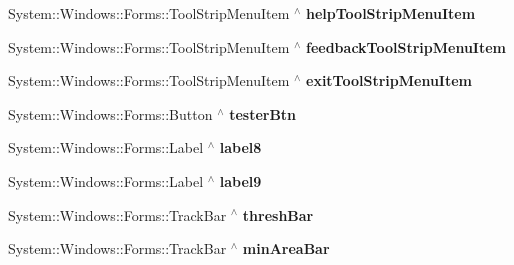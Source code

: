 \begin{DoxyCompactItemize}
\item 
\mbox{\label{class_gaze_track_g_u_i_1_1_g_u_i_ada9969399d8168dfd015a1aaa49f4c5c}} 
System\+::\+Windows\+::\+Forms\+::\+Tool\+Strip\+Menu\+Item $^\wedge$ {\bfseries help\+Tool\+Strip\+Menu\+Item}
\item 
\mbox{\label{class_gaze_track_g_u_i_1_1_g_u_i_a5c3dd5efc42814cdbb9c62536df21c50}} 
System\+::\+Windows\+::\+Forms\+::\+Tool\+Strip\+Menu\+Item $^\wedge$ {\bfseries feedback\+Tool\+Strip\+Menu\+Item}
\item 
\mbox{\label{class_gaze_track_g_u_i_1_1_g_u_i_a068e9aa97af71ba1d8130ebb7d393972}} 
System\+::\+Windows\+::\+Forms\+::\+Tool\+Strip\+Menu\+Item $^\wedge$ {\bfseries exit\+Tool\+Strip\+Menu\+Item}
\item 
\mbox{\label{class_gaze_track_g_u_i_1_1_g_u_i_aedc1a63f28084b1c0c583e72fd97e71a}} 
System\+::\+Windows\+::\+Forms\+::\+Button $^\wedge$ {\bfseries tester\+Btn}
\item 
\mbox{\label{class_gaze_track_g_u_i_1_1_g_u_i_ae04a6c2335c5d66920dcf5fe66505096}} 
System\+::\+Windows\+::\+Forms\+::\+Label $^\wedge$ {\bfseries label8}
\item 
\mbox{\label{class_gaze_track_g_u_i_1_1_g_u_i_aa5cb9097905298bf7eee197d242e9f61}} 
System\+::\+Windows\+::\+Forms\+::\+Label $^\wedge$ {\bfseries label9}
\item 
\mbox{\label{class_gaze_track_g_u_i_1_1_g_u_i_aa9d9506da1648b479476223f42c86ce6}} 
System\+::\+Windows\+::\+Forms\+::\+Track\+Bar $^\wedge$ {\bfseries thresh\+Bar}
\item 
\mbox{\label{class_gaze_track_g_u_i_1_1_g_u_i_aa1140aac8ec5637bcb33a4a8a7d32129}} 
System\+::\+Windows\+::\+Forms\+::\+Track\+Bar $^\wedge$ {\bfseries min\+Area\+Bar}
\item 
\mbox{\label{class_gaze_track_g_u_i_1_1_g_u_i_a73f874d08449bd4495ab89f2782ffa5a}} 

\end{DoxyCompactItemize}
